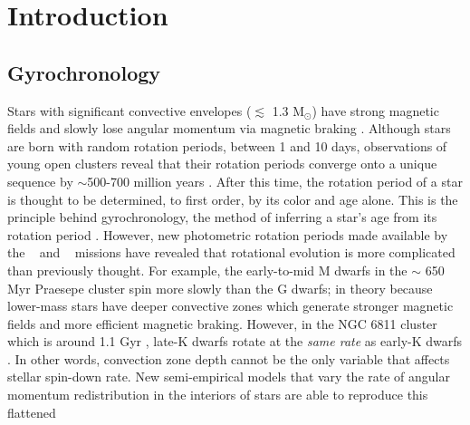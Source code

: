 \section{Introduction}

\subsection{Gyrochronology}

Stars with significant convective envelopes ($\lesssim$ 1.3 M$_\odot$) have
strong magnetic fields and slowly lose angular momentum via magnetic braking
\citep[\eg][]{schatzman1962, weber1967, skumanich1972, kawaler1988,
pinsonneault1989}.
Although stars are born with random rotation periods, between 1 and 10 days,
observations of young open clusters reveal that their rotation periods
converge onto a unique sequence by $\sim$500-700 million years
\citep[\eg][]{irwin2009, gallet2013}.
After this time, the rotation period of a star is thought to be determined, to
first order, by its color and age alone.
This is the principle behind gyrochronology, the method of inferring a
star’s age from its rotation period \citep[\eg][]{barnes2003, barnes2007,
barnes2010, meibom2011, meibom2015}.
However, new photometric rotation periods made available by the \kepler\
\citep{borucki2010} and \ktwo\ \citep{howell2014} missions
\citep[\eg][]{mcquillan2014, garcia2014, douglas2017, rebull2017, meibom2011,
meibom2015, curtis2019} have revealed that rotational evolution is more
complicated than previously thought.
For example, the early-to-mid M dwarfs in the $\sim$ 650 Myr Praesepe cluster
spin more slowly than the G dwarfs; in theory because lower-mass stars have
deeper convective zones which generate stronger magnetic fields and more
efficient magnetic braking.
However, in the NGC 6811 cluster which is around 1.1 Gyr \citep{janes2011},
late-K dwarfs rotate at the {\it same rate} as early-K dwarfs
\citep{curtis2019}.
In other words, convection zone depth cannot be the only variable that affects
stellar spin-down rate.
New semi-empirical models that vary the rate of angular momentum
redistribution in the interiors of stars are able to reproduce this flattened
